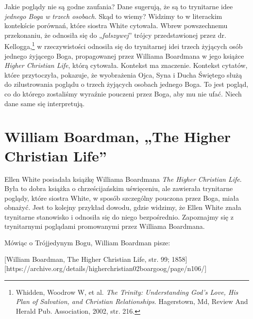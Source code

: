 Jakie poglądy nie są godne zaufania? Dane sugerują, że są to trynitarne idee \textit{jednego Boga w trzech osobach}. Skąd to wiemy? Widzimy to w literackim kontekście porównań, które siostra White cytowała. Wbrew powszechnemu przekonaniu, że odnosiła się do „\textit{fałszywej}” trójcy przedstawionej przez dr. Kellogga,\footnote{Whidden, Woodrow W, et al. \textit{The Trinity: Understanding God's Love, His Plan of Salvation, and Christian Relationships}. Hagerstown, Md, Review And Herald Pub. Association, 2002, str. 216.} w rzeczywistości odnosiła się do trynitarnej idei trzech żyjących osób jednego żyjącego Boga, propagowanej przez Williama Boardmana w jego książce \textit{Higher Christian Life}, którą cytowała. Kontekst ma znaczenie. Kontekst cytatów, które przytoczyła, pokazuje, że wyobrażenia Ojca, Syna i Ducha Świętego służą do zilustrowania poglądu o trzech żyjących osobach jednego Boga. To jest pogląd, co do którego zostaliśmy wyraźnie pouczeni przez Boga, aby mu nie ufać. Niech dane same się interpretują.

\section*{William Boardman, „The Higher Christian Life”}

Ellen White posiadała książkę Williama Boardmana \textit{The Higher Christian Life}. Była to dobra książka o chrześcijańskim uświęceniu, ale zawierała trynitarne poglądy, które siostra White, w sposób szczególny pouczona przez Boga, miała obnażyć. Jest to kolejny przykład dowodu, gdzie widzimy, że Ellen White znała trynitarne stanowisko i odnosiła się do niego bezpośrednio. Zapoznajmy się z trynitarnymi poglądami promowanymi przez Williama Boardmana.

Mówiąc o Trójjedynym Bogu, William Boardman pisze:

[William Boardman, The Higher Christian Life, str. 99; 1858][https://archive.org/details/higherchristian02boargoog/page/n106/]

